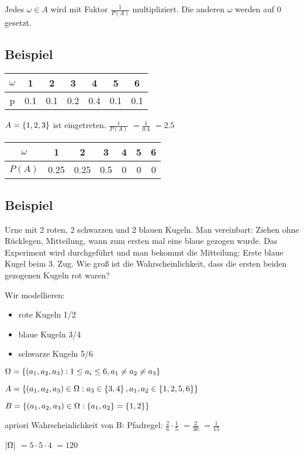 Jedes $\omega \in A$ wird mit Faktor $\frac{1}{P(A)}$ multipliziert. Die anderen $\omega$ werden auf 0 gesetzt. 

\subsection{Beispiel}
\begin{tabular}{|c|c|c|c|c|c|c|}
\hline $\omega$ & 1 & 2 & 3 & 4 & 5 & 6 \\ 
\hline p & 0.1 & 0.1 & 0.2 & 0.4 & 0.1 & 0.1 \\ 
\hline 
\end{tabular} 

$A= \left\lbrace 1,2,3 \right\rbrace $ ist eingetreten. 
$\frac{1}{P(A)}$
$=\frac{1}{0.4}$
$=2.5$

\begin{tabular}{|c|c|c|c|c|c|c|}
\hline $\omega$ & 1 & 2 & 3 & 4 & 5 & 6 \\ 
\hline $P(A)$ & 0.25 & 0.25 & 0.5 & 0 & 0 & 0 \\ 
\hline 
\end{tabular} 

\subsection{Beispiel}
Urne mit 2 roten, 2 schwarzen und 2 blauen Kugeln. Man vereinbart: Ziehen ohne Rücklegen, Mitteilung, wann zum ersten mal eine blaue gezogen wurde. Das Experiment wird durchgeführt und man bekommt die Mitteilung: \glqq Erste blaue Kugel beim 3. Zug. \grqq Wie groß ist die Wahrscheinlichkeit, dass die ersten beiden gezogenen Kugeln rot waren?

Wir modellieren: 
\begin{itemize}
\item rote Kugeln 1/2
\item blaue Kugeln 3/4
\item schwarze Kugeln 5/6
\end{itemize}

$ \Omega =  \left\lbrace (a_1,a_2,a_3) : 1\leq a_i\leq 6, a_1\neq a_2\neq a_3 \right\rbrace  $

$ A= \left\lbrace (a_1,a_2,a_3) \in \Omega : a_3\in  \left\lbrace 3,4 \right\rbrace , a_1,a_2 \in  \left\lbrace 1,2,5,6 \right\rbrace   \right\rbrace $

$ B= \left\lbrace (a_1,a_2,a_3) \in \Omega :  \left\lbrace a_1,a_2 \right\rbrace  =  \left\lbrace 1,2 \right\rbrace  \right\rbrace $

apriori Wahrscheinlichkeit von B: 
Pfadregel: $\frac{2}{6} \cdot \frac{1}{5} $
$=\frac{2}{30}$
$=\frac{1}{15}$

$ \left\vert \Omega \right\vert  $
$=5\cdot 5\cdot 4$
$=120$

